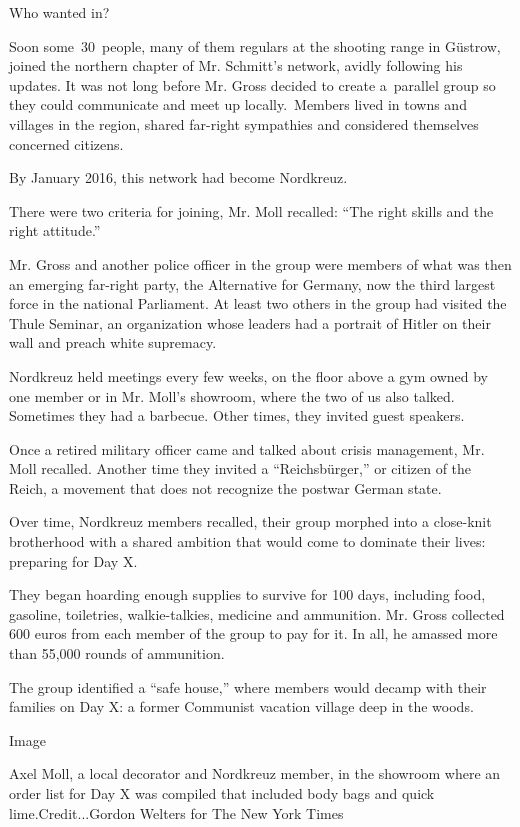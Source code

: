 Who wanted in?

Soon some~30~people, many of them regulars at the shooting range in
Güstrow, joined the northern chapter of Mr. Schmitt's network, avidly
following his updates. It was not long before Mr. Gross decided to
create a~parallel group so they could communicate and meet up
locally.~Members lived in towns and villages in the region, shared
far-right sympathies and considered themselves concerned citizens.

By January 2016, this network had become Nordkreuz.

There were two criteria for joining, Mr. Moll recalled: ``The right
skills and the right attitude.''

Mr. Gross and another police officer in the group were members of what
was then an emerging far-right party, the Alternative for Germany, now
the third largest force in the national Parliament. At least two others
in the group had visited the Thule Seminar, an organization whose
leaders had a portrait of Hitler on their wall and preach white
supremacy.

Nordkreuz held meetings every few weeks, on the floor above a gym owned
by one member or in Mr. Moll's showroom, where the two of us also
talked. Sometimes they had a barbecue. Other times, they invited guest
speakers.

Once a retired military officer came and talked about crisis management,
Mr. Moll recalled. Another time they invited a ``Reichsbürger,'' or
citizen of the Reich, a movement that does not recognize the postwar
German state.

Over time, Nordkreuz members recalled, their group morphed into a
close-knit brotherhood with a shared ambition that would come to
dominate their lives: preparing for Day X.

They began hoarding enough supplies to survive for 100 days, including
food, gasoline, toiletries, walkie-talkies, medicine and ammunition. Mr.
Gross collected 600 euros from each member of the group to pay for it.
In all, he amassed more than 55,000 rounds of ammunition.

The group identified a ``safe house,'' where members would decamp with
their families on Day X: a former Communist vacation village deep in the
woods.

Image

Axel Moll, a local decorator and Nordkreuz member, in the showroom where
an order list for Day X was compiled that included body bags and quick
lime.Credit...Gordon Welters for The New York Times

